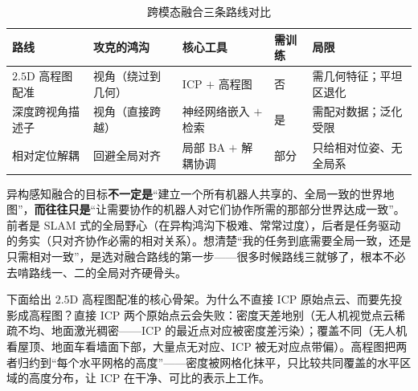 \begin{table}[H]\centering\small
\caption{跨模态融合三条路线对比}
\label{tab:hmr-fusion-routes}
\begin{tabular}{lllll}
\toprule
路线 & 攻克的鸿沟 & 核心工具 & 需训练 & 局限 \\
\midrule
$2.5\mathrm{D}$ 高程图配准 & 视角（绕过到几何） & ICP $+$ 高程图 & 否 & 需几何特征；平坦区退化 \\
深度跨视角描述子 & 视角（直接跨越） & 神经网络嵌入 $+$ 检索 & 是 & 需配对数据；泛化受限 \\
相对定位解耦 & 回避全局对齐 & 局部 BA $+$ 解耦协调 & 部分 & 只给相对位姿、无全局系 \\
\bottomrule
\end{tabular}
\end{table}

\begin{insight}
异构感知融合的目标\textbf{不一定是}“建立一个所有机器人共享的、全局一致的世界地图”，\textbf{而往往只是}“让需要协作的机器人对它们协作所需的那部分世界达成一致”。前者是 SLAM 式的全局野心（在异构鸿沟下极难、常常过度），后者是任务驱动的务实（只对齐协作必需的相对关系）。想清楚“我的任务到底需要全局一致，还是只需相对一致”，是选对融合路线的第一步——很多时候路线三就够了，根本不必去啃路线一、二的全局对齐硬骨头。
\end{insight}

\noindent 下面给出 $2.5\mathrm{D}$ 高程图配准的核心骨架。为什么不直接 ICP 原始点云、而要先投影成高程图？直接 ICP 两个原始点云会失败：密度天差地别（无人机视觉点云稀疏不均、地面激光稠密——ICP 的最近点对应被密度差污染）；覆盖不同（无人机看屋顶、地面车看墙面下部，大量点无对应、ICP 被无对应点带偏）。高程图把两者归约到“每个水平网格的高度”——密度被网格化抹平，只比较共同覆盖的水平区域的高度分布，让 ICP 在干净、可比的表示上工作。

